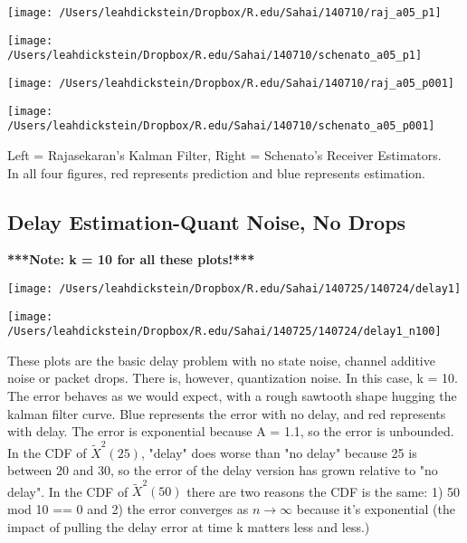 \documentclass[leqno,twocolumn]{article}
\begin{document}
\begin{minipage}[c]{0.5\textwidth}
\texttt{[image: /Users/leahdickstein/Dropbox/R.edu/Sahai/140710/raj\_a05\_p1]}
\end{minipage}
\begin{minipage}[c]{0.5\textwidth}
\texttt{[image: /Users/leahdickstein/Dropbox/R.edu/Sahai/140710/schenato\_a05\_p1]}
\end{minipage}

\begin{minipage}[c]{0.5\textwidth}
\texttt{[image: /Users/leahdickstein/Dropbox/R.edu/Sahai/140710/raj\_a05\_p001]}
\end{minipage}
\begin{minipage}[c]{0.5\textwidth}
\texttt{[image: /Users/leahdickstein/Dropbox/R.edu/Sahai/140710/schenato\_a05\_p001]}
\end{minipage}

Left = Rajasekaran's Kalman Filter, Right = Schenato's Receiver Estimators.\\
In all four figures, red represents prediction and blue represents estimation. 

\subsection{Delay Estimation-Quant Noise, No Drops}
\textbf{***Note: k = 10 for all these plots!***}\\

\begin{minipage}[c]{0.5\textwidth}
\texttt{[image: /Users/leahdickstein/Dropbox/R.edu/Sahai/140725/140724/delay1]}
\end{minipage}
\begin{minipage}[c]{0.5\textwidth}
\texttt{[image: /Users/leahdickstein/Dropbox/R.edu/Sahai/140725/140724/delay1\_n100]}
\end{minipage}

These plots are the basic delay problem with no state noise, channel additive noise or packet drops. There is, however, quantization noise. In this case, k = 10. The error behaves as we would expect, with a rough sawtooth shape hugging the kalman filter curve. Blue represents the error with no delay, and red represents with delay. The error is exponential because A = 1.1, so the error is unbounded. In the CDF of $\tilde{X}^2(25)$, "delay" does worse than "no delay" because 25 is between 20 and 30, so the error of the delay version has grown relative to "no delay". In the CDF of $\tilde{X}^2(50)$ there are two reasons the CDF is the same: 1) 50 mod 10 == 0 and 2) the error converges as $n \rightarrow \infty$ because it's exponential (the impact of pulling the delay error at time k matters less and less.)
\end{document}
